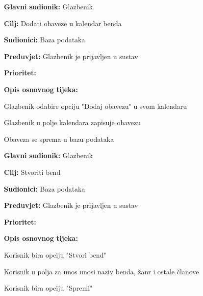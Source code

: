 \noindent {}
	\begin{packed_item}
		
		\item \textbf{Glavni sudionik: } Glazbenik
		\item \textbf{Cilj:} Dodati obaveze u kalendar benda
		\item \textbf{Sudionici:} Baza podataka
		\item \textbf{Preduvjet:} Glazbenik je prijavljen u sustav
		\item \textbf{Prioritet:} 
		\item \textbf{Opis osnovnog tijeka:} 
		
		\item[] \begin{packed_enum}
			
			\item Glazbenik odabire opciju "Dodaj obavezu" u svom kalendaru
			\item Glazbenik u polje kalendara zapisuje obavezu
			\item Obaveza se sprema u bazu podataka
		\end{packed_enum}  
	\end{packed_item}
	
\noindent {}
	\begin{packed_item}
		
		\item \textbf{Glavni sudionik: } Glazbenik 
		\item \textbf{Cilj:} Stvoriti bend
		\item \textbf{Sudionici:} Baza podataka
		\item \textbf{Preduvjet:} Glazbenik je prijavljen u sustav
		\item \textbf{Prioritet:} 
		\item \textbf{Opis osnovnog tijeka:} 
		
		\item[] \begin{packed_enum}
			
			\item Korisnik bira opciju "Stvori bend"
			\item Korisnik u polja za unos unosi naziv benda, žanr i ostale članove
			\item Korisnik bira opciju "Spremi"
		\end{packed_enum}  
	\end{packed_item}

